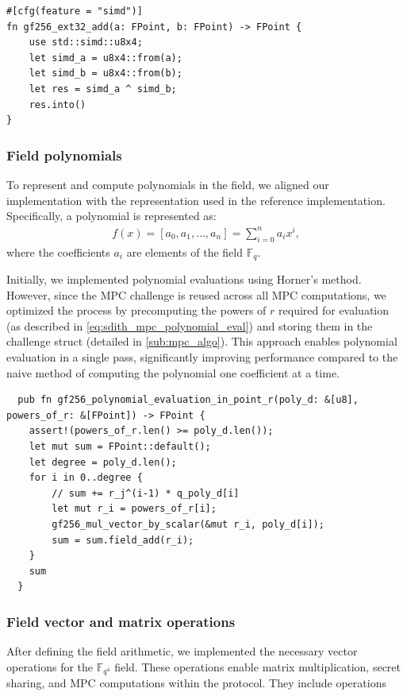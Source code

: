 \documentclass[11pt]{report}
\theoremstyle{definition}
\theoremstyle{plain}
\begin{document}
\begin{verbatim}
#[cfg(feature = "simd")]
fn gf256_ext32_add(a: FPoint, b: FPoint) -> FPoint {
    use std::simd::u8x4;
    let simd_a = u8x4::from(a);
    let simd_b = u8x4::from(b);
    let res = simd_a ^ simd_b;
    res.into()
}
\end{verbatim}

\subsubsection{Field polynomials}\label{sub:field_polynomials}
To represent and compute polynomials in the field, we aligned our implementation with the representation used in the reference implementation. Specifically, a polynomial is represented as:
\begin{align*}
  f(x) = [a_0, a_1, \dots, a_n] = \sum_{i=0}^{n} a_i x^i,
\end{align*}
where the coefficients $a_i$ are elements of the field $\mathbb{F}_{q}$.

Initially, we implemented polynomial evaluations using Horner's method. However, since the MPC challenge is reused across all MPC computations, we optimized the process by precomputing the powers of $r$ required for evaluation (as described in \autoref{eq:sdith_mpc_polynomial_eval}) and storing them in the challenge struct (detailed in \autoref{sub:mpc_algo}). This approach enables polynomial evaluation in a single pass, significantly improving performance compared to the naive method of computing the polynomial one coefficient at a time.

\begin{verbatim}
  pub fn gf256_polynomial_evaluation_in_point_r(poly_d: &[u8], powers_of_r: &[FPoint]) -> FPoint {
    assert!(powers_of_r.len() >= poly_d.len());
    let mut sum = FPoint::default();
    let degree = poly_d.len();
    for i in 0..degree {
        // sum += r_j^(i-1) * q_poly_d[i]
        let mut r_i = powers_of_r[i];
        gf256_mul_vector_by_scalar(&mut r_i, poly_d[i]);
        sum = sum.field_add(r_i);
    }
    sum
  }
\end{verbatim}

\subsubsection{Field vector and matrix operations}\label{sub:field_vector_operations}

After defining the field arithmetic, we implemented the necessary vector operations for the $\mathbb{F}_{q^4}$ field. These operations enable matrix multiplication, secret sharing, and MPC computations within the protocol. They include operations
\end{document}
